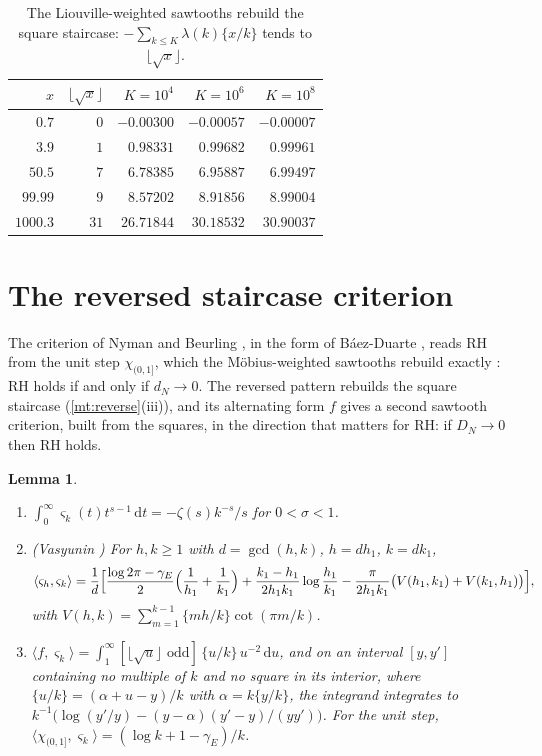 \documentclass[11pt]{article}
\newtheorem{lemma}[theorem]{Lemma}
\theoremstyle{definition}\newtheorem{definition}[theorem]{Definition}
\theoremstyle{remark}\newtheorem{remark}[theorem]{Remark}
\theoremstyle{definition}\newtheorem{axiom}{Axiom}
\newcommand{\dd}{\,\mathrm d}\newcommand{\e}{\mathrm e}
\newcommand{\fr}[1]{\{#1\}}
\begin{document}
\begin{table}[!htbp]\centering\small
\begin{tabular}{@{}rrrrr@{}}\toprule
$x$ & $\lfloor\sqrt x\rfloor$ & $K=10^4$ & $K=10^6$ & $K=10^8$\\\midrule
$0.7$ & $0$ & $-0.00300$ & $-0.00057$ & $-0.00007$\\
$3.9$ & $1$ & $0.98331$ & $0.99682$ & $0.99961$\\
$50.5$ & $7$ & $6.78385$ & $6.95887$ & $6.99497$\\
$99.99$ & $9$ & $8.57202$ & $8.91856$ & $8.99004$\\
$1000.3$ & $31$ & $26.71844$ & $30.18532$ & $30.90037$\\\bottomrule
\end{tabular}
\caption{The Liouville-weighted sawtooths rebuild the square staircase: $-\sum_{k\le K}\lambda(k)\fr{x/k}$ tends to $\lfloor\sqrt x\rfloor$.}\label{tab:revsaw}
\end{table}

\section{The reversed staircase criterion}\label{sec:revNB}

The criterion of Nyman and Beurling \cite{Nyman,Beurling}, in the form of Báez-Duarte \cite{BaezDuarte}, reads RH from the unit step $\chi_{(0,1]}$, which the Möbius-weighted sawtooths rebuild exactly \cite{S10}: RH holds if and only if $d_N\to0$. The reversed pattern rebuilds the square staircase (\cref{mt:reverse}(iii)), and its alternating form $f$ gives a second sawtooth criterion, built from the squares, in the direction that matters for RH: if $D_N\to0$ then RH holds.

\begin{lemma}\label{lem:mellin}
\begin{enumerate}[label=\textup{(\alph*)}]
\item $\int_0^\infty\varsigma_k(t)t^{s-1}\dd t=-\zeta(s)k^{-s}/s$ for $0<\sigma<1$.
\item \textup{(Vasyunin \cite{Vasyunin})} For $h,k\ge1$ with $d=\gcd(h,k)$, $h=dh_1$, $k=dk_1$,
\[
\langle\varsigma_h,\varsigma_k\rangle=\frac1d\Bigl[\frac{\log2\pi-\gamma_E}2\Bigl(\frac1{h_1}+\frac1{k_1}\Bigr)+\frac{k_1-h_1}{2h_1k_1}\log\frac{h_1}{k_1}-\frac\pi{2h_1k_1}\bigl(V(h_1,k_1)+V(k_1,h_1)\bigr)\Bigr],
\]
with $V(h,k)=\sum_{m=1}^{k-1}\fr{mh/k}\cot(\pi m/k)$.
\item $\langle f,\varsigma_k\rangle=\int_1^\infty[\lfloor\sqrt u\rfloor\text{ odd}]\,\fr{u/k}\,u^{-2}\dd u$, and on an interval $[y,y']$ containing no multiple of $k$ and no square in its interior, where $\fr{u/k}=(\alpha+u-y)/k$ with $\alpha=k\fr{y/k}$, the integrand integrates to $k^{-1}\bigl(\log(y'/y)-(y-\alpha)(y'-y)/(yy')\bigr)$. For the unit step, $\langle\chi_{(0,1]},\varsigma_k\rangle=(\log k+1-\gamma_E)/k$.
\end{enumerate}
\end{lemma}
\end{document}
